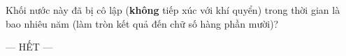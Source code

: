 	\begin{ex}%
		\label{VinhLong-SoGD-Lan1-III6}Khối nước này đã bị cô lập (\textbf{không} tiếp xúc với khí quyển) trong thời gian là bao nhiêu năm (làm tròn kết quả đến chữ số hàng phần mười)?
		\par
	\end{ex}

	\centerline{--- HẾT ---}


